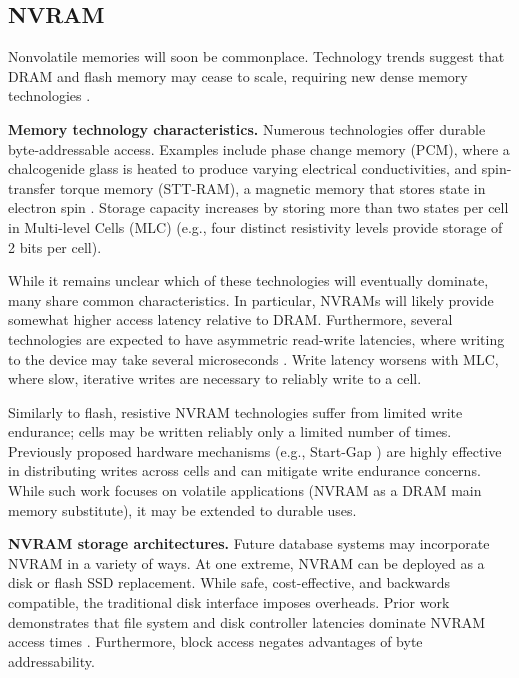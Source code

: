 \subsection{NVRAM}
\label{sec:Background:Storage:NVRAM}

Nonvolatile memories will soon be commonplace.
Technology trends suggest that DRAM and flash memory may cease to scale, requiring new dense memory technologies \cite{LeeIpek09}.

\textbf{Memory technology characteristics.}
Numerous technologies offer durable byte-addressable access.
Examples include phase change memory (PCM), where a chalcogenide glass is heated to produce varying electrical conductivities, and spin-transfer torque memory (STT-RAM), a magnetic memory that stores state in electron spin \cite{BurrKurdi08}.
Storage capacity increases by storing more than two states per cell in Multi-level Cells (MLC) (e.g., four distinct resistivity levels provide storage of 2 bits per cell).

While it remains unclear which of these technologies will eventually dominate, many share common characteristics.
In particular, NVRAMs will likely provide somewhat higher access latency relative to DRAM.
Furthermore, several technologies are expected to have asymmetric read-write latencies, where writing to the device may take several microseconds \cite{QureshiSrinivasan09}.
Write latency worsens with MLC, where slow, iterative writes are necessary to reliably write to a cell.

Similarly to flash, resistive NVRAM technologies suffer from limited write endurance; cells may be written reliably only a limited number of times.
Previously proposed hardware mechanisms (e.g., Start-Gap \cite{QureshiKaridis09}) are highly effective in distributing writes across cells and can mitigate write endurance concerns.
While such work focuses on volatile applications (NVRAM as a DRAM main memory substitute), it may be extended to durable uses.

\textbf{NVRAM storage architectures.}
Future database systems may incorporate NVRAM in a variety of ways.
At one extreme, NVRAM can be deployed as a disk or flash SSD replacement.
While safe, cost-effective, and backwards compatible, the traditional disk interface imposes overheads.
Prior work demonstrates that file system and disk controller latencies dominate NVRAM access times \cite{CaulfieldDe10}.
Furthermore, block access negates advantages of byte addressability.

